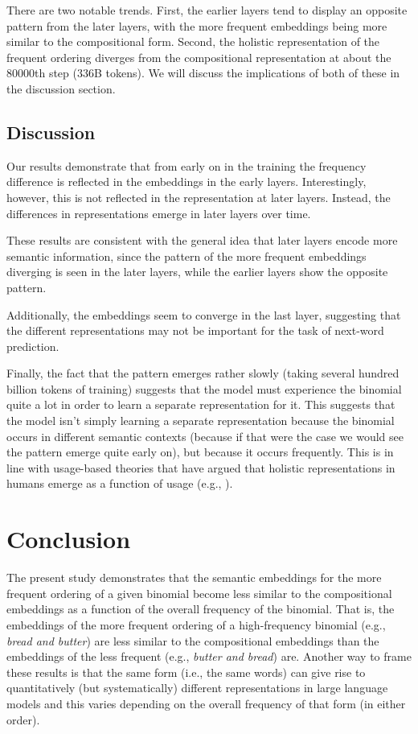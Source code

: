 \documentclass[
  12pt,
  letterpaper,
]{scrreprt}
\begin{document}
There are two notable trends. First, the earlier layers tend to display
an opposite pattern from the later layers, with the more frequent
embeddings being more similar to the compositional form. Second, the
holistic representation of the frequent ordering diverges from the
compositional representation at about the 80000th step (336B tokens). We
will discuss the implications of both of these in the discussion
section.

\subsection{Discussion}\label{discussion-9}

Our results demonstrate that from early on in the training the frequency
difference is reflected in the embeddings in the early layers.
Interestingly, however, this is not reflected in the representation at
later layers. Instead, the differences in representations emerge in
later layers over time.

These results are consistent with the general idea that later layers
encode more semantic information, since the pattern of the more frequent
embeddings diverging is seen in the later layers, while the earlier
layers show the opposite pattern.

Additionally, the embeddings seem to converge in the last layer,
suggesting that the different representations may not be important for
the task of next-word prediction.

Finally, the fact that the pattern emerges rather slowly (taking several
hundred billion tokens of training) suggests that the model must
experience the binomial quite a lot in order to learn a separate
representation for it. This suggests that the model isn't simply
learning a separate representation because the binomial occurs in
different semantic contexts (because if that were the case we would see
the pattern emerge quite early on), but because it occurs frequently.
This is in line with usage-based theories that have argued that holistic
representations in humans emerge as a function of usage (e.g.,
).

\section{Conclusion}\label{conclusion-2}

The present study demonstrates that the semantic embeddings for the more
frequent ordering of a given binomial become less similar to the
compositional embeddings as a function of the overall frequency of the
binomial. That is, the embeddings of the more frequent ordering of a
high-frequency binomial (e.g., \emph{bread and butter}) are less similar
to the compositional embeddings than the embeddings of the less frequent
(e.g., \emph{butter and bread}) are. Another way to frame these results
is that the same form (i.e., the same words) can give rise to
quantitatively (but systematically) different representations in large
language models and this varies depending on the overall frequency of
that form (in either order).
\end{document}
